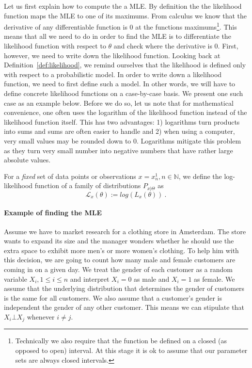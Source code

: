 Let us first explain how to compute the a MLE. By definition the the likelihood function maps the MLE to
one of its maximums. From calculus we know that the derivative of any differentiable function is 0 at the
functions maximums\footnote{Technically we also require that the function be defined on a closed 
(as opposed to open) interval. At this stage it is ok to assume that our parameter sets are always closed
intervals.}. This means that all we need to do in order to find the MLE is to differentiate the likelihood 
function with respect to $ \theta $ and check where the derivative is 0. 
First, however, we need to write down the likelihood function.
Looking back at Definition~\ref{def:likelihood}, we remind ourselves that the likelihood is defined only
with respect to a probabilistic model. In order to write down a likelihood function, we need to first
define such a model. In other words, we will have to define concrete likelihood functions on a case-by-case 
basis. We present one such case as an example below. Before we do so, let us note that for mathematical
convenience, one often uses the logarithm of the likelihood function instead of the likelihood function
itself. This has two advantages: 1) logarithms turn products into sums and sums are often easier to handle
and 2) when using a computer, very small values may be rounded down to 0. Logarithms mitigate this problem
as they turn very small number into negative numbers that have rather large absolute values.

\begin{Definition}
For a \emph{fixed} set of data points or observations $ x = x^{1}_{n}, n \in \mathbb{N} $, we define the 
log-likelihood function of a 
family of distributions $ P_{x|\Theta} $ as 
$$ \mathcal{L}_{x}(\theta) := log \left(L_{x}(\theta) \right) \ . $$
\end{Definition}

\paragraph{Example of finding the MLE} Assume we have to market research for a clothing store in Amsterdam.
The store wants to expand its size and the manager wonders whether he should use the extra space to 
exhibit more men's or more women's clothing. To help him with this decision, we are going to count 
how many male and female customers are coming in on a given day. We treat the gender of each customer
as a random variable $ X_{i}, 1 \leq i \leq n $ and interpret $ X_{i} = 0 $ as male and $ X_{i} = 1 $ as
female. We assume that the underlying distribution that determines the gender of customers
is the same for all customers. We also assume that a customer's gender is independent the gender of any
other customer. This means we can stipulate that $ X_{i} \bot X_{j} $ whenever $ i \not = j $.

